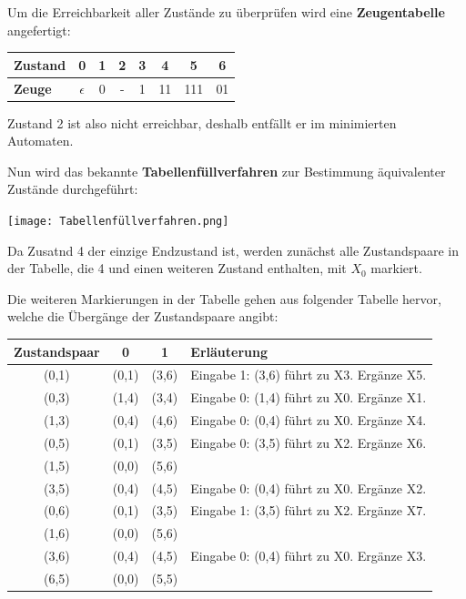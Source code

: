 	Um die Erreichbarkeit aller Zustände zu überprüfen wird eine \textbf{Zeugentabelle} angefertigt:\\
	\begin{tabular}{l|ccccccc}
		\textbf{Zustand} & 0          & 1 & 2 & 3 & 4  & 5   & 6 \\
		\hline
		\textbf{Zeuge}   & $\epsilon$ & 0 & - & 1 & 11 & 111 & 01 \\
	\end{tabular} 
	Zustand 2 ist also nicht erreichbar, deshalb entfällt er im minimierten Automaten.
	
	Nun wird das bekannte \textbf{Tabellenfüllverfahren} zur Bestimmung äquivalenter Zustände durchgeführt: 
	
	\texttt{[image: Tabellenfüllverfahren.png]}

	Da Zusatnd 4 der einzige Endzustand ist, werden zunächst alle Zustandspaare in der Tabelle, die 4 und einen weiteren Zustand enthalten, mit $X_0$ markiert.
	
	Die weiteren Markierungen in der Tabelle gehen aus folgender Tabelle hervor, welche die Übergänge der Zustandspaare angibt:

	\begin{tabular}{c|c|c|l}
		\textbf{Zustandspaar} & \textbf{0} & \textbf{1} & \textbf{Erläuterung} \\
		\hline
		(0,1)                 & (0,1)      & (3,6)      & Eingabe 1: (3,6) führt zu X3. Ergänze X5. \\		
		\hline
		(0,3)                 & (1,4)      & (3,4)      & Eingabe 0: (1,4) führt zu X0. Ergänze X1. \\
		\hline
		(1,3)                 & (0,4)      & (4,6)      & Eingabe 0: (0,4) führt zu X0. Ergänze X4. \\
		\hline 		 		
		(0,5)                 & (0,1)      & (3,5)      & Eingabe 0: (3,5) führt zu X2. Ergänze X6. \\
		\hline 		
		(1,5)                 & (0,0)      & (5,6)      & \\
		\hline
		(3,5)                 & (0,4)      & (4,5)      & Eingabe 0: (0,4) führt zu X0. Ergänze X2. \\
		\hline
		(0,6)                 & (0,1)      & (3,5)      & Eingabe 1: (3,5) führt zu X2. Ergänze X7. \\
		\hline
		(1,6)                 & (0,0)      & (5,6)      & \\
		\hline
		(3,6)                 & (0,4)      & (4,5)      & Eingabe 0: (0,4) führt zu X0. Ergänze X3. \\
		\hline
		(6,5)                 & (0,0)      & (5,5)      & \\
	\end{tabular} 
	
